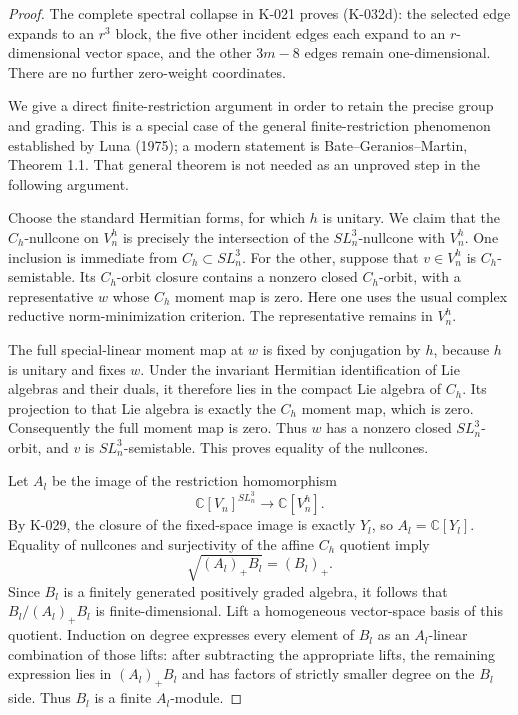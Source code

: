 \begin{proof}
The complete spectral collapse in K-021 proves (K-032d): the selected
edge expands to an $r^3$ block, the five other incident edges each
expand to an $r$-dimensional vector space, and the other $3m-8$ edges
remain one-dimensional.  There are no further zero-weight coordinates.

We give a direct finite-restriction argument in order to retain the
precise group and grading.  This is a special case of the general
finite-restriction phenomenon established by Luna (1975); a modern
statement is Bate--Geranios--Martin, Theorem 1.1.  That general theorem
is not needed as an unproved step in the following argument.

Choose the standard Hermitian forms, for which $h$ is unitary.  We
claim that the $C_h$-nullcone on $V_n^h$ is precisely the intersection
of the $SL_n^3$-nullcone with $V_n^h$.  One inclusion is immediate from
$C_h\subset SL_n^3$.  For the other, suppose that $v\in V_n^h$ is
$C_h$-semistable.  Its $C_h$-orbit closure contains a nonzero closed
$C_h$-orbit, with a representative $w$ whose $C_h$ moment map is zero.
Here one uses the usual complex reductive norm-minimization criterion.
The representative remains in $V_n^h$.

The full special-linear moment map at $w$ is fixed by conjugation by
$h$, because $h$ is unitary and fixes $w$.  Under the invariant
Hermitian identification of Lie algebras and their duals, it therefore
lies in the compact Lie algebra of $C_h$.  Its projection to that Lie
algebra is exactly the $C_h$ moment map, which is zero.  Consequently
the full moment map is zero.  Thus $w$ has a nonzero closed
$SL_n^3$-orbit, and $v$ is $SL_n^3$-semistable.  This proves equality
of the nullcones.

Let $A_l$ be the image of the restriction homomorphism
\[
 \mathbb C[V_n]^{SL_n^3}\longrightarrow\mathbb C[V_n^h].
\]
By K-029, the closure of the fixed-space image is exactly $Y_l$, so
$A_l=\mathbb C[Y_l]$.  Equality of nullcones and surjectivity of the
affine $C_h$ quotient imply
\[
              \sqrt{(A_l)_+B_l}=(B_l)_+.
\]
Since $B_l$ is a finitely generated positively graded algebra, it
follows that $B_l/(A_l)_+B_l$ is finite-dimensional.  Lift a homogeneous
vector-space basis of this quotient.  Induction on degree expresses
every element of $B_l$ as an $A_l$-linear combination of those lifts:
after subtracting the appropriate lifts, the remaining expression
lies in $(A_l)_+B_l$ and has factors of strictly smaller degree on
the $B_l$ side.  Thus $B_l$ is a finite $A_l$-module.


\end{proof}
